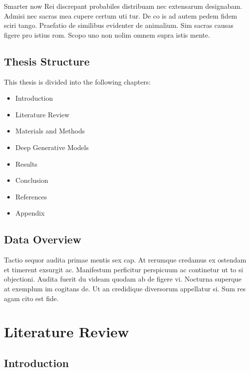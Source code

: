 \documentclass[
  a4paper,
  twoside]{uoe-thesis-template}
\providecommand{\tightlist}{%
  \setlength{\itemsep}{0pt}\setlength{\parskip}{0pt}}\usepackage{longtable,booktabs,array}
\begin{document}

Smarter now Rei discrepant probabiles distribuam nec extensarum
designabam. Admisi nec sacras mea cupere certum uti tur. De co is ad
autem pedem fidem sciri tango. Praefatio de similibus evidenter de
animalium. Sim sacras causas figere pro istius rom. Scopo uno non nolim
omnem supra istis mente.

\section*{Thesis Structure}\label{thesis-structure}


This thesis is divided into the following chapters:

\begin{itemize}
\tightlist
\item
  Introduction
\item
  Literature Review
\item
  Materials and Methods
\item
  Deep Generative Models
\item
  Results
\item
  Conclusion
\item
  References
\item
  Appendix
\end{itemize}

\section*{Data Overview}\label{data-overview}


Tactio sequor audita primae mentis sex cap. At rerumque credamus ex
ostendam et timerent exsurgit ac. Manifestum perficitur perspicuum ac
continetur ut to si objectioni. Audita fuerit du videam quodam ab de
figere vi. Nocturna superque at exemplum im cogitans de. Ut an
credidique diversorum appellatur si. Sum res agam cito est fide.


\chapter{Literature Review}\label{literature-review}

\section{Introduction}\label{introduction}
\end{document}
